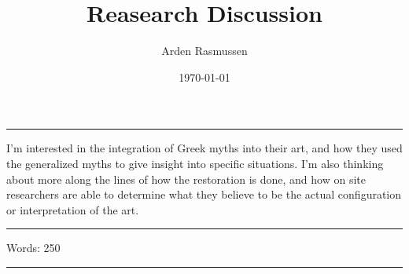 \documentclass[12pt]{amsart}
\title{Reasearch Discussion}
\author{Arden Rasmussen}
\date{\today}
\begin{document}
\maketitle

\par\noindent\rule{\textwidth}{0.4pt}

I'm interested in the integration of Greek myths into their art, and how they
used the generalized myths to give insight into specific situations. I'm also
thinking about more along the lines of how the restoration is done, and how on
site researchers are able to determine what they believe to be the actual
configuration or interpretation of the art.

\par\noindent\rule{\textwidth}{0.4pt}
Words: 250
\par\noindent\rule{\textwidth}{0.4pt}
\end{document}
